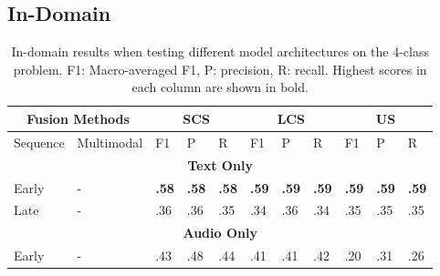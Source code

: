 \documentclass{article}
\begin{document}
\subsection{In-Domain}\label{app:res-id}

\begin{table}[h]
\centering
\caption{In-domain results when testing different model architectures on the 4-class problem. F1: Macro-averaged F1, P: precision, R: recall. Highest scores in each column are shown in bold.}
\begin{tabular}{|lllllllllll|}
\hline
\multicolumn{2}{|c|}{Fusion Methods}                                              & \multicolumn{3}{c|}{\textbf{SCS}}                               & \multicolumn{3}{c|}{\textbf{LCS}}                               & \multicolumn{3}{c|}{\textbf{US}}           \\ \hline
\multicolumn{1}{|l|}{Sequence}               & \multicolumn{1}{l|}{Multimodal}    & F1           & P            & \multicolumn{1}{l|}{R}            & F1           & P            & \multicolumn{1}{l|}{R}            & F1           & P            & R            \\ \hline
\multicolumn{11}{|c|}{\textbf{Text Only}}                                                                                                                                                                                                                          \\ \hline
\multicolumn{1}{|l|}{Early}                  & \multicolumn{1}{l|}{-}             & \textbf{.58} & \textbf{.58} & \multicolumn{1}{l|}{\textbf{.58}} & \textbf{.59} & \textbf{.59} & \multicolumn{1}{l|}{\textbf{.59}} & \textbf{.59} & \textbf{.59} & \textbf{.59} \\
\multicolumn{1}{|l|}{Late}                   & \multicolumn{1}{l|}{-}             & .36          & .36          & \multicolumn{1}{l|}{.35}             & .34          & .36          & \multicolumn{1}{l|}{.34}             & .35          & .35          & .35          \\ \hline
\multicolumn{11}{|c|}{\textbf{Audio Only}}                                                                                                                                                                                                                         \\ \hline
\multicolumn{1}{|l|}{Early}                  & \multicolumn{1}{l|}{-}             & .43          & .48          & \multicolumn{1}{l|}{.44}          & .41          & .41          & \multicolumn{1}{l|}{.42}          & .20          & .31          & .26          \\

\end{tabular}
\end{table}
\end{document}
